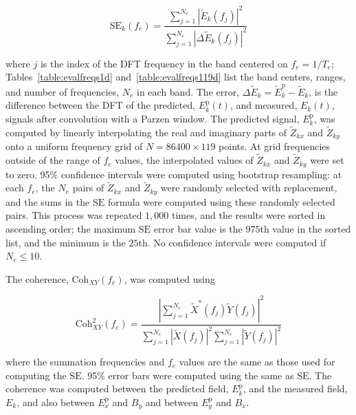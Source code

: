 \documentclass[draft,linenumbers]{agujournal2018}
\begin{document}
\begin{equation}
\text{SE}_k(f_e) = \frac{\displaystyle\sum_{j=1}^{N_e} \left|\widetilde{E}_k(f_j)\right|^2}{\displaystyle\sum_{j=1}^{N_e}\left|\Delta\widetilde{E}_k(f_j)\right|^2}
\end{equation}

\noindent where $j$ is the index of the DFT frequency in the band centered on $f_e=1/T_e$; Tables~\ref{table:evalfreqs1d} and~\ref{table:evalfreqs119d} list the band centers, ranges, and number of frequencies, $N_e$ in each band. The error, $\Delta\widetilde{E}_k = \widetilde{E}_k^{\text{p}}-\widetilde{E}_k$, is the difference between the DFT of the predicted, $E_k^\text{p}(t)$, and measured, $E_k(t)$, signals after convolution with a Parzen window. The predicted signal, $E_k^{\text{p}}$, was computed by linearly interpolating the real and imaginary parts of $\widetilde{Z}_{kx}$ and $\widetilde{Z}_{ky}$ onto a uniform frequency grid of $N=86400\times 119$ points. At grid frequencies outside of the range of $f_e$ values, the interpolated values of $\widetilde{Z}_{kx}$ and $\widetilde{Z}_{ky}$ were set to zero. 95\% confidence intervals were computed using bootstrap resampling: at each $f_e$, the $N_e$ pairs of $\widetilde{Z}_{kx}$ and $\widetilde{Z}_{ky}$ were randomly selected with replacement, and the sums in the $\text{SE}$ formula were computed using these randomly selected pairs. This process was repeated $1,000$ times, and the results were sorted in ascending order; the maximum $\text{SE}$ error bar value is the $975$th value in the sorted list, and the minimum is the $25$th. No confidence intervals were computed if $N_e\le 10$.

The coherence, $\text{Coh}_{XY}(f_e)$, was computed using

\begin{equation}
\text{Coh}^2_{XY}(f_e) = \frac{\left|\displaystyle\sum_{j=1}^{N_e}\widetilde{X}^*(f_j)\widetilde{Y}(f_j)\right|^2}{\displaystyle\sum_{j=1}^{N_e} \left|\widetilde{X}(f_j)\right|^2\sum_{j=1}^{N_e} \left|\widetilde{Y}(f_j)\right|^2}
\end{equation}

\noindent where the summation frequencies and $f_e$ values are the same as those used for computing the $\text{SE}$. 95\% error bars were computed using the same as $\text{SE}$. The coherence was computed between the predicted field, $E^\text{p}_k$, and the measured field, $E_k$, and also between $E_x^\text{p}$ and $B_y$ and between $E_y^\text{p}$ and $B_x$.
\end{document}

